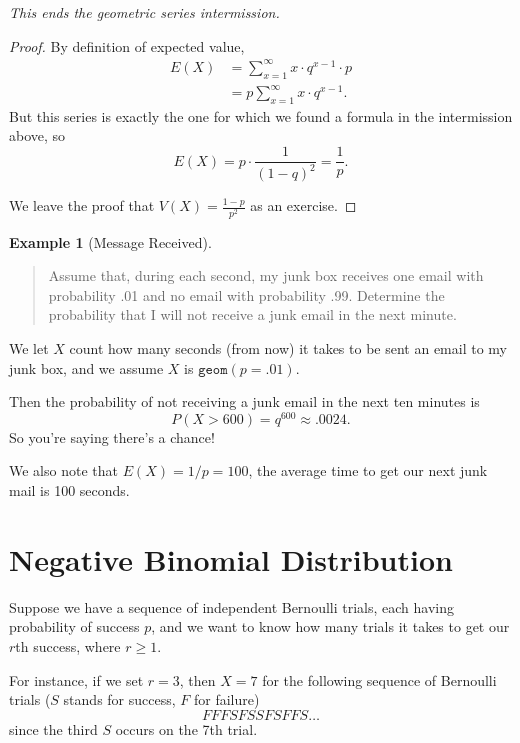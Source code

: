 \documentclass[
]{book}
\theoremstyle{definition}
\theoremstyle{definition}
\newtheorem{example}{Example}[chapter]
\theoremstyle{definition}
\theoremstyle{definition}
\theoremstyle{remark}
\begin{document}
\emph{This ends the geometric series intermission.}

\begin{proof}
By definition of expected value,
\begin{align*}
E(X) &= \sum_{x=1}^\infty x \cdot q^{x-1}\cdot p \\
&= p \sum_{x=1}^\infty x \cdot q^{x-1}.
\end{align*}
But this series is exactly the one for which we found a formula in the intermission above, so \[E(X) = p \cdot \frac{1}{(1-q)^2} = \frac{1}{p}.\]

We leave the proof that \(V(X) = \frac{1-p}{p^2}\) as an exercise.
\end{proof}

\begin{example}[Message Received]
\leavevmode

\begin{quote}
Assume that, during each second, my junk box receives one email with probability .01 and no email with probability .99. Determine the probability that I will not receive a junk email in the next minute.
\end{quote}

We let \(X\) count how many seconds (from now) it takes to be sent an email to my junk box, and we assume \(X\) is \(\texttt{geom}(p = .01)\).

Then the probability of not receiving a junk email in the next ten minutes is \[P(X > 600) = q^{600} \approx .0024.\]
So you're saying there's a chance!

We also note that \(E(X) = 1/p = 100\), the average time to get our next junk mail is 100 seconds.

\end{example}

\section{Negative Binomial Distribution}\label{negative-binomial}

Suppose we have a sequence of independent Bernoulli trials, each having probability of success \(p\), and we want to know how many trials it takes to get our \(r\)th success, where \(r \geq 1\).

For instance, if we set \(r = 3\), then \(X = 7\) for the following sequence of Bernoulli trials (\(S\) stands for success, \(F\) for failure)
\[F F F S F S S F S F F S \ldots \]
since the third \(S\) occurs on the 7th trial.
\end{document}

